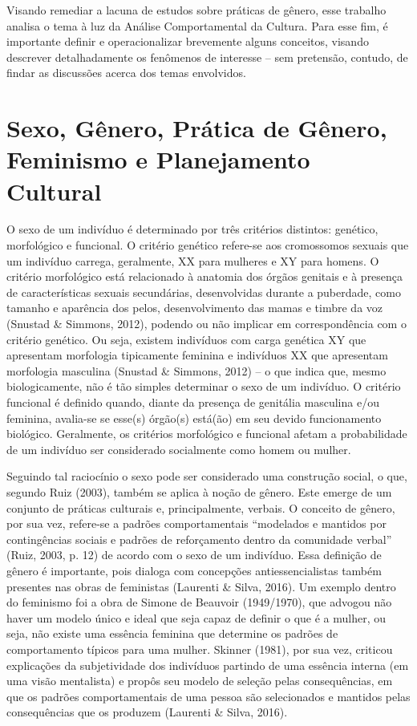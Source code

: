 Visando remediar a lacuna de estudos sobre práticas de gênero, esse trabalho analisa o tema à luz da Análise Comportamental da Cultura. Para esse fim, é importante definir e operacionalizar brevemente alguns conceitos, visando descrever detalhadamente os fenômenos de interesse – sem pretensão, contudo, de findar as discussões acerca dos temas envolvidos.

\section*{Sexo, Gênero, Prática de Gênero, Feminismo e Planejamento Cultural}

O sexo de um indivíduo é determinado por três critérios distintos: genético, morfológico e funcional. O critério genético refere-se aos cromossomos sexuais que um indivíduo carrega, geralmente, XX para mulheres e XY para homens. O critério morfológico está relacionado à anatomia dos órgãos genitais e à presença de características sexuais secundárias, desenvolvidas durante a puberdade, como tamanho e aparência dos pelos, desenvolvimento das mamas e timbre da voz (Snustad \& Simmons, 2012), podendo ou não implicar em correspondência com o critério genético. Ou seja, existem indivíduos com carga genética XY que apresentam morfologia tipicamente feminina e indivíduos XX que apresentam morfologia masculina (Snustad \& Simmons, 2012) – o que indica que, mesmo biologicamente, não é tão simples determinar o sexo de um indivíduo. O critério funcional é definido quando, diante da presença de genitália masculina e/ou feminina, avalia-se se esse(s) órgão(s) está(ão) em seu devido funcionamento biológico. Geralmente, os critérios morfológico e funcional afetam a probabilidade de um indivíduo ser considerado socialmente como homem ou mulher.

Seguindo tal raciocínio o sexo pode ser considerado uma construção social, o que, segundo Ruiz (2003), também se aplica à noção de gênero. Este emerge de um conjunto de práticas culturais e, principalmente, verbais. O conceito de gênero, por sua vez, refere-se a padrões comportamentais “modelados e mantidos por contingências sociais e padrões de reforçamento dentro da comunidade verbal” (Ruiz, 2003, p. 12) de acordo com o sexo de um indivíduo. Essa definição de gênero é importante, pois dialoga com concepções antiessencialistas também presentes nas obras de feministas (Laurenti \& Silva, 2016). Um exemplo dentro do feminismo foi a obra de Simone de Beauvoir (1949/1970), que advogou não haver um modelo único e ideal que seja capaz de definir o que é a mulher, ou seja, não existe uma essência feminina que determine os padrões de comportamento típicos para uma mulher. Skinner (1981), por sua vez, criticou explicações da subjetividade dos indivíduos partindo de uma essência interna (em uma visão mentalista) e propôs seu modelo de seleção pelas consequências, em que os padrões comportamentais de uma pessoa são selecionados e mantidos pelas consequências que os produzem (Laurenti \& Silva, 2016).

